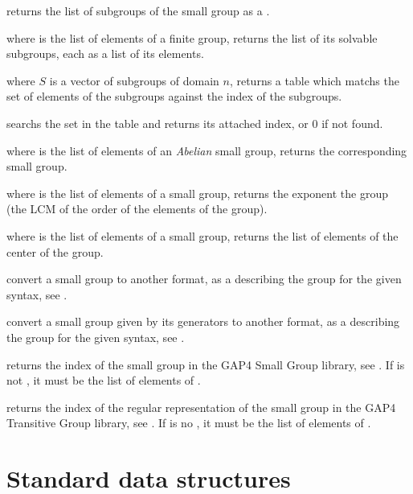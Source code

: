  returns the list of subgroups of the
small group  as a .

 where  is the list of
elements of a finite group, returns the list of its solvable subgroups,
each as a list of its elements.

 where $S$ is a vector of subgroups
of domain $n$, returns a table which matchs the set of elements of the
subgroups against the index of the subgroups.

 searchs the set  in
the table  and returns its attached index, or $0$ if not found.

 where  is the list of
elements of an \emph{Abelian} small group, returns the corresponding
small group.

 where  is the list of
elements of a small group, returns the exponent the group (the LCM of the order
of the elements of the group).

 where  is the list of elements
of a small group, returns the list of elements of the center of the
group.

 convert a small group
to another format, as a  describing the group for the given syntax,
see .

 convert a small group
given by its generators to another format, as a  describing the group
for the given syntax, see .

 returns the index of the small group
 in the GAP4 Small Group library, see . If
 is not , it must be the list of elements of .

 returns the index of the
regular representation of the small group  in the GAP4 Transitive
Group library, see . If  is no , it must be
the list of elements of .

\newpage
\chapter{Standard data structures}

